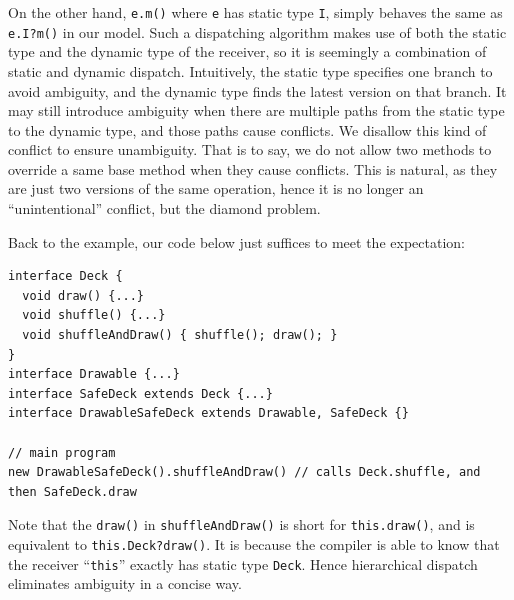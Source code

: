 On the other hand, \lstinline|e.m()| where \lstinline|e| has static type \lstinline|I|, simply behaves the same as \lstinline|e.I?m()| in our model. Such a dispatching algorithm makes use of both the static type and the dynamic type of the receiver, so it is seemingly a combination of static and dynamic dispatch. Intuitively, the static type specifies one branch to avoid ambiguity, and the dynamic type finds the latest version on that branch. It may still introduce ambiguity when there are multiple paths from the static type to the dynamic type, and those paths cause conflicts. We disallow this kind of conflict to ensure unambiguity. That is to say, we do not allow two methods to override a same base method when they cause conflicts. This is natural, as they are just two versions of the same operation, hence it is no longer an ``unintentional'' conflict, but the diamond problem.

Back to the example, our code below just suffices to meet the expectation:
\vspace{3pt}\begin{lstlisting}
interface Deck {
  void draw() {...}
  void shuffle() {...}
  void shuffleAndDraw() { shuffle(); draw(); }
}
interface Drawable {...}
interface SafeDeck extends Deck {...}
interface DrawableSafeDeck extends Drawable, SafeDeck {}

// main program
new DrawableSafeDeck().shuffleAndDraw() // calls Deck.shuffle, and then SafeDeck.draw
\end{lstlisting}\vspace{3pt}
Note that the \lstinline|draw()| in \lstinline|shuffleAndDraw()| is short for \lstinline|this.draw()|, and is equivalent to \lstinline|this.Deck?draw()|. It is because the compiler is able to know that the receiver ``\lstinline|this|'' exactly has static type \lstinline|Deck|. Hence hierarchical dispatch eliminates ambiguity in a concise way.\\


